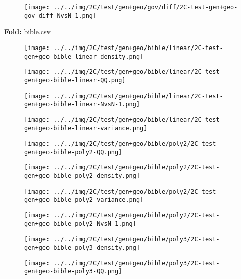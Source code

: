 \begin{figure}[H]
\centering	\texttt{[image: ../../img/2C/test/gen+geo/gov/diff/2C-test-gen+geo-gov-diff-NvsN-1.png]}
\end{figure}
\textbf{Fold:} bible.csv
\begin{figure}[H]
\centering	\texttt{[image: ../../img/2C/test/gen+geo/bible/linear/2C-test-gen+geo-bible-linear-density.png]}
\end{figure}
\begin{figure}[H]
\centering	\texttt{[image: ../../img/2C/test/gen+geo/bible/linear/2C-test-gen+geo-bible-linear-QQ.png]}
\end{figure}
\begin{figure}[H]
\centering	\texttt{[image: ../../img/2C/test/gen+geo/bible/linear/2C-test-gen+geo-bible-linear-NvsN-1.png]}
\end{figure}
\begin{figure}[H]
\centering	\texttt{[image: ../../img/2C/test/gen+geo/bible/linear/2C-test-gen+geo-bible-linear-variance.png]}
\end{figure}
\begin{figure}[H]
\centering	\texttt{[image: ../../img/2C/test/gen+geo/bible/poly2/2C-test-gen+geo-bible-poly2-QQ.png]}
\end{figure}
\begin{figure}[H]
\centering	\texttt{[image: ../../img/2C/test/gen+geo/bible/poly2/2C-test-gen+geo-bible-poly2-density.png]}
\end{figure}
\begin{figure}[H]
\centering	\texttt{[image: ../../img/2C/test/gen+geo/bible/poly2/2C-test-gen+geo-bible-poly2-variance.png]}
\end{figure}
\begin{figure}[H]
\centering	\texttt{[image: ../../img/2C/test/gen+geo/bible/poly2/2C-test-gen+geo-bible-poly2-NvsN-1.png]}
\end{figure}
\begin{figure}[H]
\centering	\texttt{[image: ../../img/2C/test/gen+geo/bible/poly3/2C-test-gen+geo-bible-poly3-density.png]}
\end{figure}
\begin{figure}[H]
\centering	\texttt{[image: ../../img/2C/test/gen+geo/bible/poly3/2C-test-gen+geo-bible-poly3-QQ.png]}
\end{figure}
